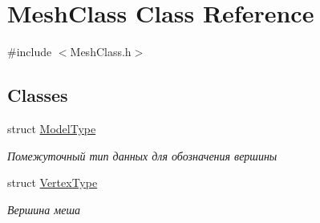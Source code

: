 \hypertarget{class_mesh_class}{}\section{Mesh\+Class Class Reference}
\label{class_mesh_class}


{\ttfamily \#include $<$Mesh\+Class.\+h$>$}

\subsection*{Classes}
\begin{DoxyCompactItemize}
\item 
struct \hyperlink{struct_mesh_class_1_1_model_type}{Model\+Type}
\begin{DoxyCompactList}\small\item\em Помежуточный тип данных для обозначения вершины \end{DoxyCompactList}\item 
struct \hyperlink{struct_mesh_class_1_1_vertex_type}{Vertex\+Type}
\begin{DoxyCompactList}\small\item\em Вершина меша \end{DoxyCompactList}\end{DoxyCompactItemize}
